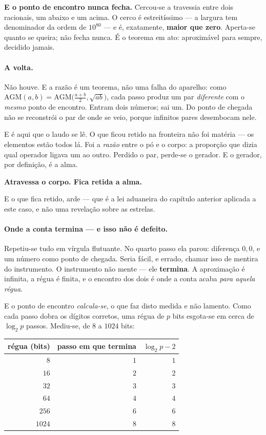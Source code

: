 \documentclass[11pt]{article}
\theoremstyle{plain}
\theoremstyle{remark}
\begin{document}
\medskip
\noindent\textbf{E o ponto de encontro nunca fecha.} Cercou-se a travessia entre
dois racionais, um abaixo e um acima. O cerco é estreitíssimo --- a largura tem
denominador da ordem de $10^{80}$ --- e é, exatamente, \textbf{maior que zero}.
Aperta-se quanto se queira; não fecha nunca. É o teorema em ato: aproximável para
sempre, decidido jamais.

\paragraph{A volta.} Não houve. E a razão é um teorema, não uma falha do
aparelho: como $\mathrm{AGM}(a,b)=\mathrm{AGM}\bigl(\frac{a+b}{2},\sqrt{ab}\bigr)$,
cada passo produz um par \emph{diferente} com o \emph{mesmo} ponto de encontro.
Entram dois números; sai um. Do ponto de chegada não se reconstrói o par de onde
se veio, porque infinitos pares desembocam nele.

\medskip
\noindent E é aqui que o laudo se lê. O que ficou retido na fronteira não foi
matéria --- os elementos estão todos lá. Foi a \emph{razão} entre o pó e o corpo:
a proporção que dizia qual operador ligava um ao outro. Perdido o par, perde-se o
gerador. E o gerador, por definição, é a alma.

\begin{center}
\textbf{Atravessa o corpo. Fica retida a alma.}
\end{center}

\noindent E o que fica retido, arde --- que é a lei aduaneira do capítulo
anterior aplicada a este caso, e não uma revelação sobre as estrelas.

\paragraph{Onde a conta termina --- e isso não é defeito.} Repetiu-se tudo em
vírgula flutuante. No quarto passo ela parou: diferença $0{,}0$, e um número como
ponto de chegada. Seria fácil, e errado, chamar isso de mentira do instrumento. O
instrumento não mente --- ele \textbf{termina}. A aproximação é infinita, a régua
é finita, e o encontro dos dois é onde a conta acaba \emph{para aquela régua}.

\medskip
\noindent E o ponto de encontro \emph{calcula-se}, o que faz disto medida e não
lamento. Como cada passo dobra os dígitos corretos, uma régua de $p$ bits
esgota-se em cerca de $\log_2 p$ passos. Mediu-se, de $8$ a $1024$ bits:

\begin{center}
\begin{tabular}{r r r}
\toprule
régua (bits) & passo em que termina & $\log_2 p - 2$ \\
\midrule
$8$ & $1$ & $1$ \\
$16$ & $2$ & $2$ \\
$32$ & $3$ & $3$ \\
$64$ & $4$ & $4$ \\
$256$ & $6$ & $6$ \\
$1024$ & $8$ & $8$ \\
\bottomrule
\end{tabular}
\end{center}
\end{document}
